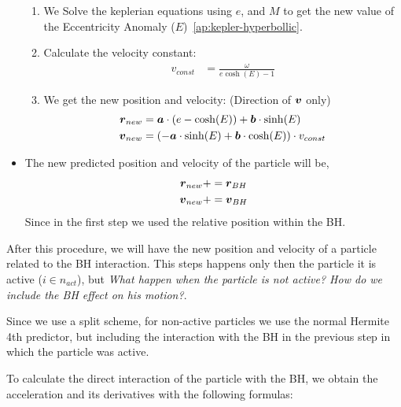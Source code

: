 \begin{itemize}
\begin{enumerate}
            \item We Solve the keplerian equations using $e$, and $M$ to get the
                    new value of the Eccentricity Anomaly ($E$)~\ref{ap:kepler-hyperbollic}.

            \item Calculate the velocity constant:
                \begin{align}
                    v_{const} &= \frac{\omega}{e \cosh(E) - 1}
                \end{align}
%
            \item We get the new position and velocity:
                (Direction of $\boldsymbol{v}$ only)
                \begin{align}
                    \boldsymbol{r}_{new} &= \boldsymbol{a}\cdot (e - \cosh(E)) + \boldsymbol{b}\cdot \sinh(E) \\
                    \boldsymbol{v}_{new} &= (-\boldsymbol{a}\cdot \sinh(E) + \boldsymbol{b}\cdot \cosh(E)) \cdot v_{const}
                \end{align}
        \end{enumerate}
        \item The new predicted position and velocity of the particle will be,
            \begin{align}
                \boldsymbol{r}_{new} &+= \boldsymbol{r}_{BH}\\
                \boldsymbol{v}_{new} &+= \boldsymbol{v}_{BH}\\
            \end{align}
            Since in the first step we used the relative position within the BH.

\end{itemize}

After this procedure, we will have the new position and velocity
of a particle related to the BH interaction.
This steps happens only then the particle it is active ($i\in n_{act}$),
but \emph{What happen when the particle is not active? How do we include
the BH effect on his motion?}.

Since we use a split scheme, for non-active particles we use the normal
Hermite 4th predictor, but including the interaction with the BH in the previous
step in which the particle was active.

To calculate the direct interaction of the particle with the BH,
we obtain the acceleration and its derivatives with the following
formulas:

